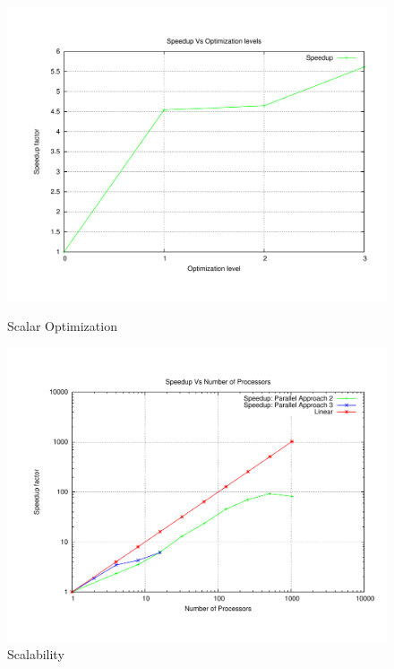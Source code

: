 \documentclass[a4paper, 11pt, oneside]{scrartcl}
\begin{document}
\begin{figure}[!htb]
\centering
{}
\centering
\includegraphics[scale=0.33]{./Performance.pdf}
\caption{Scalar Optimization}
\endminipage\hfill
\centering
{}
\centering
\includegraphics[scale=0.33]{./parallel.pdf}
\caption{Scalability}
\endminipage\hfill
\end{figure}
\end{document}
